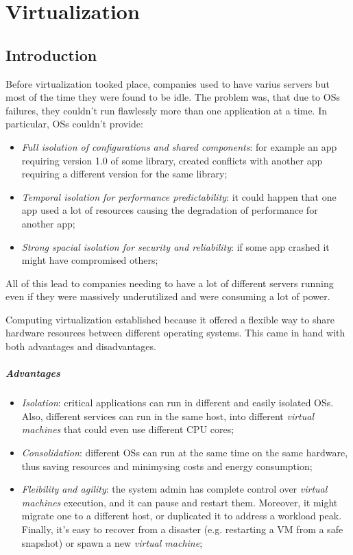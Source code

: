 \chapter{Virtualization}
\section{Introduction}
Before virtualization tooked place, companies used to have varius servers but
most of the time they were found to be idle. The problem was, that due to OSs
failures, they couldn't run flawlessly more than one application at a time. In
particular, OSs couldn't provide:
\begin{itemize}
    \item\emph{Full isolation of configurations and shared components}: for
    example an app requiring version 1.0 of some library, created conflicts
    with another app requiring a different version for the same library;
    \item\emph{Temporal isolation for performance predictability}: it could
    happen that one app used a lot of resources causing the degradation of
    performance for another app;
    \item\emph{Strong spacial isolation for security and reliability}: if
    some app crashed it might have compromised others;
\end{itemize}
All of this lead to companies needing to have a lot of different servers running
even if they were massively underutilized and were consuming a lot of power.

Computing virtualization established because it offered a flexible way to
share hardware resources between different operating systems. This came in hand
with both advantages and disadvantages.

\paragraph{Advantages}
\begin{itemize}
    \item\emph{Isolation}: critical applications can run in different and
    easily isolated OSs. Also, different services can run in the same host,
    into different \emph{virtual machines} that could even use different CPU cores;
    \item\emph{Consolidation}: different OSs can run at the same time on the
    same hardware, thus saving resources and minimysing costs and energy
    consumption;
    \item\emph{Fleibility and agility}: the system admin has complete control
    over \emph{virtual machines} execution, and it can pause and restart them.
    Moreover, it might migrate one to a different host, or duplicated it to address a
    workload peak. Finally, it's easy to recover from a disaster (e.g. restarting
    a VM from a safe snapshot) or spawn a new \emph{virtual machine};
\end{itemize}
